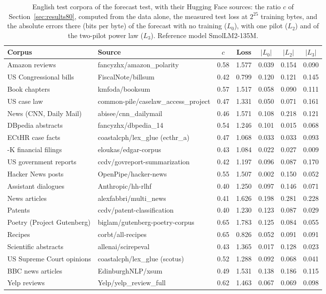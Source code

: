 \begin{table}[tbp]
\centering\footnotesize
\caption{English test corpora of the forecast test, with their Hugging Face sources: the ratio $c$ of Section~\ref{sec:results80}, computed from the data alone, the measured test loss at $2^{25}$ training bytes, and the absolute errors there (bits per byte) of the forecast with no training ($L_0$), with one pilot ($L_2$) and of the two-pilot power law ($L_3$). Reference model SmolLM2-135M.}
\label{tab:corpora}
\setlength{\tabcolsep}{4pt}
\begin{tabular}{@{}>{\raggedright\arraybackslash}p{3.3cm}>{\raggedright\arraybackslash}p{4.9cm}ccccc@{}}
\toprule
Corpus & Source & $c$ & Loss & $|L_0|$ & $|L_2|$ & $|L_3|$ \\
\midrule
Amazon reviews & fancyzhx/amazon\_polarity & 0.58 & 1.577 & 0.039 & 0.154 & 0.090 \\
US Congressional bills & FiscalNote/billsum & 0.42 & 0.799 & 0.120 & 0.121 & 0.145 \\
Book chapters & kmfoda/booksum & 0.57 & 1.517 & 0.058 & 0.090 & 0.111 \\
US case law & common-pile/caselaw\_access\_project & 0.47 & 1.331 & 0.050 & 0.071 & 0.161 \\
News (CNN, Daily Mail) & abisee/cnn\_dailymail & 0.46 & 1.571 & 0.108 & 0.218 & 0.121 \\
DBpedia abstracts & fancyzhx/dbpedia\_14 & 0.54 & 1.246 & 0.101 & 0.015 & 0.068 \\
ECtHR case facts & coastalcph/lex\_glue (ecthr\_a) & 0.47 & 1.068 & 0.033 & 0.033 & 0.093 \\
10-K financial filings & eloukas/edgar-corpus & 0.43 & 1.084 & 0.022 & 0.027 & 0.009 \\
US government reports & ccdv/govreport-summarization & 0.42 & 1.197 & 0.096 & 0.087 & 0.170 \\
Hacker News posts & OpenPipe/hacker-news & 0.55 & 1.507 & 0.002 & 0.150 & 0.052 \\
Assistant dialogues & Anthropic/hh-rlhf & 0.40 & 1.250 & 0.097 & 0.146 & 0.071 \\
News articles & alexfabbri/multi\_news & 0.41 & 1.626 & 0.198 & 0.281 & 0.228 \\
Patents & ccdv/patent-classification & 0.40 & 1.230 & 0.123 & 0.087 & 0.029 \\
Poetry (Project Gutenberg) & biglam/gutenberg-poetry-corpus & 0.65 & 1.783 & 0.125 & 0.084 & 0.055 \\
Recipes & corbt/all-recipes & 0.65 & 0.826 & 0.052 & 0.091 & 0.091 \\
Scientific abstracts & allenai/scirepeval & 0.43 & 1.365 & 0.017 & 0.128 & 0.023 \\
US Supreme Court opinions & coastalcph/lex\_glue (scotus) & 0.52 & 1.288 & 0.092 & 0.068 & 0.041 \\
BBC news articles & EdinburghNLP/xsum & 0.49 & 1.531 & 0.138 & 0.186 & 0.115 \\
Yelp reviews & Yelp/yelp\_review\_full & 0.62 & 1.463 & 0.067 & 0.069 & 0.098 \\
\bottomrule
\end{tabular}
\end{table}

